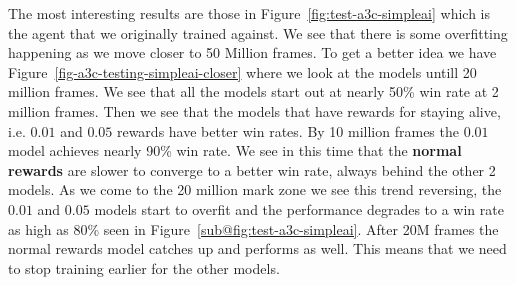 \medskip
\noindent
The most interesting results are those in Figure~\ref{fig:test-a3c-simpleai} which is the agent that we originally trained against. We see that there is some overfitting happening as we move closer to 50 Million frames. To get a better idea we have Figure~\ref{fig-a3c-testing-simpleai-closer} where we look at the models untill 20 million frames. We see that all the models start out at nearly 50\% win rate at 2 million frames. Then we see that the models that have rewards for staying alive, i.e. $0.01$ and $0.05$ rewards have better win rates. By 10 million frames the $0.01$ model achieves nearly 90\% win rate. We see in this time that the \textbf{normal rewards} are slower to converge to a better win rate, always behind the other 2 models. As we come to the 20 million mark zone we see this trend reversing, the $0.01$ and $0.05$ models start to overfit and the performance degrades to a win rate as high as 80\% seen in Figure~\ref{sub@fig:test-a3c-simpleai}. After 20M frames the normal rewards model catches up and performs as well. This means that we need to stop training earlier for the other models.

